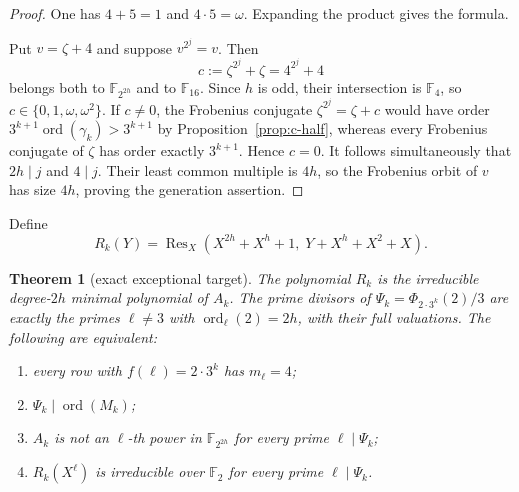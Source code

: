 \documentclass[11pt]{article}
\newtheorem{theorem}{Theorem}[section]
\theoremstyle{definition}
\theoremstyle{remark}
\begin{document}
\begin{proof}
One has $4+5=1$ and $4\cdot5=\omega$.  Expanding the product gives the
formula.

Put $v=\zeta+4$ and suppose $v^{2^j}=v$.  Then
\[
 c:=\zeta^{2^j}+\zeta=4^{2^j}+4
\]
belongs both to $\mathbb F_{2^{2h}}$ and to $\mathbb F_{16}$.  Since $h$ is
odd, their intersection is $\mathbb F_4$, so
$c\in\{0,1,\omega,\omega^2\}$.  If $c\ne0$, the Frobenius conjugate
$\zeta^{2^j}=\zeta+c$ would have order
$3^{k+1}\operatorname{ord}(\gamma_k)>3^{k+1}$ by
Proposition~\ref{prop:c-half}, whereas every Frobenius conjugate of $\zeta$
has order exactly $3^{k+1}$.  Hence $c=0$.  It follows simultaneously that
$2h\mid j$ and $4\mid j$.  Their least common multiple is $4h$, so the
Frobenius orbit of $v$ has size $4h$, proving the generation assertion.
\end{proof}

Define
\[
 R_k(Y)=\operatorname{Res}_X
 \left(X^{2h}+X^h+1,\;Y+X^h+X^2+X\right).
\]

\begin{theorem}[exact exceptional target]\label{thm:d-target}
The polynomial $R_k$ is the irreducible degree-$2h$ minimal polynomial of
$A_k$.  The prime divisors of
$\Psi_k=\Phi_{2\cdot3^k}(2)/3$ are exactly the primes
$\ell\ne3$ with $\operatorname{ord}_\ell(2)=2h$, with their full
valuations.  The following are equivalent:
\begin{enumerate}
\item every row with $f(\ell)=2\cdot3^k$ has $m_\ell=4$;
\item $\Psi_k\mid\operatorname{ord}(M_k)$;
\item $A_k$ is not an $\ell$-th power in $\mathbb F_{2^{2h}}$ for every
      prime $\ell\mid\Psi_k$;
\item $R_k(X^\ell)$ is irreducible over $\mathbb F_2$ for every prime
      $\ell\mid\Psi_k$.
\end{enumerate}
\end{theorem}
\end{document}
